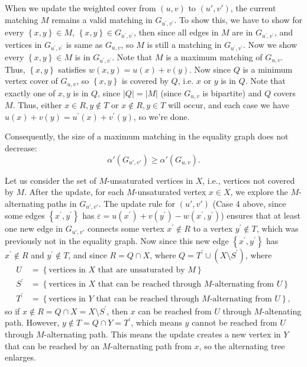 \begin{remark}
When we update the weighted cover from $(u, v)$ to $(u', v')$, the current matching $M$ remains a valid matching in \(G_{u^{\prime}, v^{\prime} }\). To show this, we have to show for every \(\left\{ x, y \right\}  \in M\), \(\left\{ x, y \right\} \in G_{u^{\prime} , v^{\prime}} \), then since all edges in \(M\) are in \(G_{u^{\prime} , v^{\prime} }\), and vertices in \(G_{u^{\prime} , v^{\prime} }\) is same as \(G_{u, v}\), so \(M\) is still a matching in \(G_{u^{\prime} , v^{\prime} }\). Now we show every \(\left\{ x, y \right\} \in M \) is in \(G_{u^{\prime} , v^{\prime} }\). Note that \(M\) is a maximum matching of \(G_{u, v}\). Thus, \(\left\{ x, y \right\} \) satisfies \(w(x, y) = u(x) + v(y)\). Now since \(Q\) is a minimum vertex cover of \(G_{u, v}\), so \(\left\{ x, y \right\} \) is covered by \(Q\), i.e. \(x\) or \(y\) is in \(Q\). Note that exactly one of \(x, y\) is in \(Q\), since \(\vert Q \vert = \vert M \vert  \) (since \(G_{u, v}\) is bipartite) and \(Q\) covers \(M\). Thus, either \(x \in R, y \notin T\) or \(x \notin R, y \in T\) will occur, and each case we have \(u(x) + v(y) = u^{\prime} (x) + v^{\prime} (y)\), so we're done.    

Consequently, the size of a maximum matching in the equality graph does not decrease:
\[
\alpha'(G_{u',v'}) \ge \alpha'(G_{u,v}).
\]

\medskip

Let us consider the set of $M$-unsaturated vertices in $X$, i.e., vertices not covered by $M$. 
After the update, for each $M$-unsaturated vertex $x \in X$, we explore the $M$-alternating paths in $G_{u',v'}$. 
The update rule for $(u',v')$ (Case 4 above, since some edges \(\left\{ x^{\prime} , y^{\prime}  \right\} \) has \(\varepsilon = u(x^{\prime} ) + v(y^{\prime} ) - w(x^{\prime} , y^{\prime} )\)) ensures that at least one new edge in $G_{u',v'}$ connects some vertex $x^{\prime}  \notin R$ to a vertex $y^{\prime}  \notin T$, 
which was previously not in the equality graph. Now since this new edge \(\left\{ x^{\prime} , y^{\prime}  \right\} \) has \(x^{\prime} \notin R\) and \(y^{\prime} \notin T\), and since \(R = Q \cap X\), where \(Q = T^{\prime} \cup (X \setminus S^{\prime} )\), where 
\begin{align*}
    U &= \left\{ \text{vertices in } X \text{ that are unsaturated by } M  \right\} \\ 
    S^{\prime} &= \left\{ \text{vertices in } X \text{ that can be reached through } M\text{-alternating from } U    \right\} \\
    T^{\prime} &= \left\{ \text{vertices in } Y \text{ that can be reached through } M\text{-alternating from } U    \right\},
\end{align*}
so if \(x \notin R = Q \cap X = X \setminus S^{\prime} \), then \(x\) can be reached from \(U\) through \(M\)-altenating path. However, \(y \notin T = Q \cap Y = T^{\prime}\), which means \(y\) cannot be reached from \(U\) through \(M\)-alternating path.       
This means the update creates a new vertex in $Y$ that can be reached by an $M$-alternating path from $x$, so the alternating tree enlarges. 


\end{remark}

